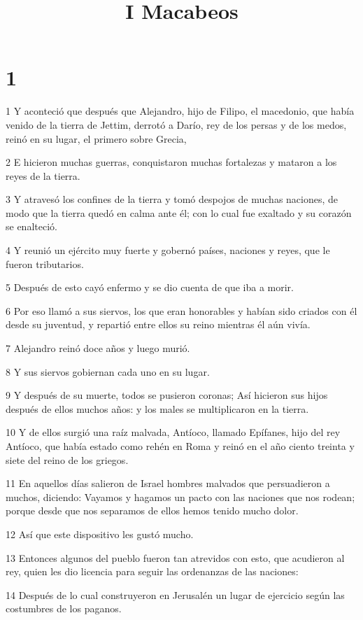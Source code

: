 

\title{I Macabeos}

\chapter{1}

\par 1 Y aconteció que después que Alejandro, hijo de Filipo, el macedonio, que había venido de la tierra de Jettim, derrotó a Darío, rey de los persas y de los medos, reinó en su lugar, el primero sobre Grecia,
\par 2 E hicieron muchas guerras, conquistaron muchas fortalezas y mataron a los reyes de la tierra.
\par 3 Y atravesó los confines de la tierra y tomó despojos de muchas naciones, de modo que la tierra quedó en calma ante él; con lo cual fue exaltado y su corazón se enalteció.
\par 4 Y reunió un ejército muy fuerte y gobernó países, naciones y reyes, que le fueron tributarios.
\par 5 Después de esto cayó enfermo y se dio cuenta de que iba a morir.
\par 6 Por eso llamó a sus siervos, los que eran honorables y habían sido criados con él desde su juventud, y repartió entre ellos su reino mientras él aún vivía.
\par 7 Alejandro reinó doce años y luego murió.
\par 8 Y sus siervos gobiernan cada uno en su lugar.
\par 9 Y después de su muerte, todos se pusieron coronas; Así hicieron sus hijos después de ellos muchos años: y los males se multiplicaron en la tierra.
\par 10 Y de ellos surgió una raíz malvada, Antíoco, llamado Epífanes, hijo del rey Antíoco, que había estado como rehén en Roma y reinó en el año ciento treinta y siete del reino de los griegos.
\par 11 En aquellos días salieron de Israel hombres malvados que persuadieron a muchos, diciendo: Vayamos y hagamos un pacto con las naciones que nos rodean; porque desde que nos separamos de ellos hemos tenido mucho dolor.
\par 12 Así que este dispositivo les gustó mucho.
\par 13 Entonces algunos del pueblo fueron tan atrevidos con esto, que acudieron al rey, quien les dio licencia para seguir las ordenanzas de las naciones:
\par 14 Después de lo cual construyeron en Jerusalén un lugar de ejercicio según las costumbres de los paganos.
